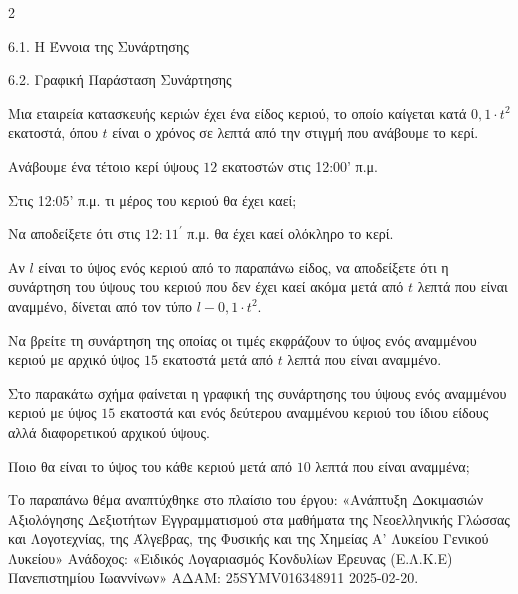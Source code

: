 \begin{ylh}{2}
    \item 6.1. Η Έννοια της Συνάρτησης
    \item 6.2. Γραφική Παράσταση Συνάρτησης
\end{ylh}

Μια εταιρεία κατασκευής κεριών έχει ένα είδος κεριού, το οποίο καίγεται κατά $0,1 \cdot t^{2}$ εκατοστά, όπου $t$ είναι ο χρόνος σε λεπτά από την στιγμή που ανάβουμε το κερί.

\begin{alist}
\item Ανάβουμε ένα τέτοιο κερί ύψους $12$ εκατοστών στις 12:00' π.μ.

\begin{rlist}
\item Στις 12:05' π.μ. τι μέρος του κεριού θα έχει καεί;
\item Να αποδείξετε ότι στις $12:11^{'}$ π.μ. θα έχει καεί ολόκληρο το κερί.
\end{rlist}
\item Αν $l$ είναι το ύψος ενός κεριού από το παραπάνω είδος, να αποδείξετε ότι η συνάρτηση του ύψους του κεριού που δεν έχει καεί ακόμα μετά από $t$ λεπτά που είναι αναμμένο, δίνεται από τον τύπο $l - 0,1 \cdot t^{2}$.
\item

\begin{rlist}
\item Να βρείτε τη συνάρτηση της οποίας οι τιμές εκφράζουν το ύψος ενός αναμμένου κεριού με αρχικό ύψος $15$ εκατοστά μετά από $t$ λεπτά που είναι αναμμένο.
\item Στο παρακάτω σχήμα φαίνεται η γραφική της συνάρτησης του ύψους ενός αναμμένου κεριού με ύψος $15$ εκατοστά και ενός δεύτερου αναμμένου κεριού του ίδιου είδους αλλά διαφορετικού αρχικού ύψους.


Ποιο θα είναι το ύψος του κάθε κεριού μετά από $10$ λεπτά που είναι αναμμένα;

{\footnotesize Το παραπάνω θέμα αναπτύχθηκε στο πλαίσιο του έργου: «Ανάπτυξη Δοκιμασιών Αξιολόγησης Δεξιοτήτων Εγγραμματισμού στα μαθήματα της Νεοελληνικής Γλώσσας και Λογοτεχνίας, της Άλγεβρας, της Φυσικής και της Χημείας Α' Λυκείου Γενικού Λυκείου» Ανάδοχος: «Ειδικός Λογαριασμός Κονδυλίων Έρευνας (Ε.Λ.Κ.Ε) Πανεπιστημίου Ιωαννίνων» ΑΔΑΜ: 25SYMV016348911 2025-02-20.}
\end{rlist}
\end{alist}

